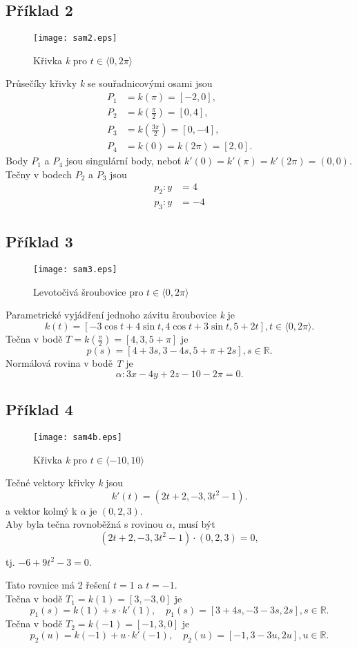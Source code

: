 \subsection*{Příklad 2}
\begin{figure}[H]
	\centering
	\texttt{[image: sam2.eps]}
	\caption{Křivka \textit{k} pro $t \in \langle0, 2\pi\rangle$}
	
\end{figure} 
Průsečíky křivky \textit{k} se souřadnicovými osami jsou
\begin{align*}
	P_1 & = k(\pi) = [-2, 0],                       \\
	P_2 & = k\left(\frac{\pi}{2}\right) = [0, 4],   \\
	P_3 & = k\left(\frac{3\pi}{2}\right) = [0, -4], \\
	P_4 & = k(0) = k(2\pi) = [2, 0].                
\end{align*}
Body $P_1$ a $P_4$ jsou singulární body, neboť $k'(0)=k'(\pi)=k'(2\pi)=(0,0)$. \\
Tečny v bodech $P_2$ a $P_3$ jsou
\begin{align*}
	p_2: y & = 4  \\
	p_3: y & = -4 
\end{align*}  	
\clearpage
\subsection*{Příklad 3}	
\begin{figure}[H]
	\centering
	\texttt{[image: sam3.eps]}
	\caption{Levotočivá šroubovice pro $t \in \langle0, 2\pi\rangle$}
	
\end{figure} 
Parametrické vyjádření jednoho závitu šroubovice \textit{k} je
$$k(t)=[-3\cos{t}+4\sin{t}, 4\cos{t}+3\sin{t}, 5+2t], t \in \langle0, 2\pi\rangle.$$
Tečna v bodě $T=k\left(\frac{\pi}{2}\right)=[4,3,5+\pi]$ je
$$p(s)=[4+3s, 3-4s, 5+\pi+2s], s \in \mathbb{R}.$$
Normálová rovina v bodě \textit{T} je
$$\alpha: 3x-4y+2z-10-2\pi=0.$$
\subsection*{Příklad 4}	
\begin{figure}[H]
	\centering
	\texttt{[image: sam4b.eps]}
	\caption{Křivka \textit{k} pro $t \in \langle-10, 10\rangle$}
	
\end{figure} 
Tečné vektory křivky \textit{k} jsou
$$k'(t)=(2t+2,-3,3t^2-1).$$
a vektor kolmý k $\alpha$ je $(0,2,3)$. \\
Aby byla tečna rovnoběžná s rovinou $\alpha$, musí být
$$(2t+2,-3,3t^2-1) \cdot (0,2,3)=0,$$
\begin{center}
	tj. $-6+9t^2-3=0$. \\
\end{center}
Tato rovnice má 2 řešení $t=1$ a $t=-1$. \\
Tečna v bodě $T_1=k(1)=[3,-3,0]$ je 
$$p_1(s)=k(1)+s \cdot k'(1), \quad p_1(s)=[3+4s,-3-3s, 2s], s \in \mathbb{R}.$$
Tečna v bodě $T_2=k(-1)=[-1,3,0]$ je 
$$p_2(u)=k(-1)+u \cdot k'(-1), \quad p_2(u)=[-1,3-3u, 2u], u \in \mathbb{R}.$$